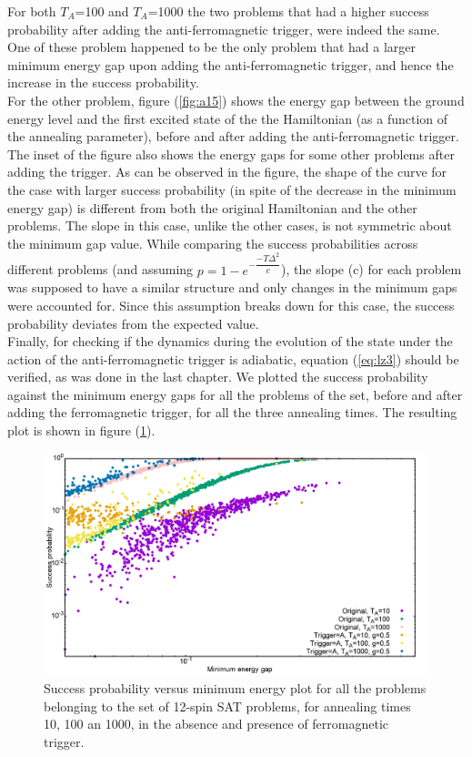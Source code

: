 \documentclass[12]{article}
\begin{document}
For both $T_A$=100 and $T_A$=1000 the two problems that had a higher success probability after adding the anti-ferromagnetic trigger, were indeed the same. One of these problem happened to be the only problem that had a larger minimum energy gap upon adding the anti-ferromagnetic trigger, and hence the increase in the success probability. \\
For the other problem, figure (\ref{fig:a15}) shows the energy gap between the ground energy level and the first excited state of the the Hamiltonian (as a function of the annealing parameter), before and after adding the anti-ferromagnetic trigger. The inset of the figure also shows the energy gaps for some other problems after adding the trigger. As can be observed in the figure, the shape of the curve for the case with larger success probability (in spite of the decrease in the minimum energy gap) is different from both the original Hamiltonian and the other problems. The slope in this case, unlike the other cases, is not symmetric about the minimum gap value. While comparing the success probabilities across different problems (and assuming $p=1-e^{-\dfrac{-T {\Delta}^2}{c}}$), the slope (c) for  each problem was supposed to have a similar structure and only changes in the minimum gaps were accounted for. Since this assumption breaks down for this case, the success probability deviates from the expected value.\\

Finally, for checking if the dynamics during the evolution of the state under the action of the anti-ferromagnetic trigger is adiabatic, equation (\ref{eq:lz3}) should be verified, as was done in the last chapter. We plotted the success probability against the minimum energy gaps for all the problems of the set, before and after adding the ferromagnetic trigger, for all the three annealing times. The resulting plot is shown in figure (\ref{fig:a17}).

\begin{figure}[H]
\centering 
\includegraphics[scale=0.3]{SuccVsGap_OA_g0.png}
\caption{Success probability versus minimum energy plot for all the problems belonging to the set of 12-spin SAT problems, for annealing times 10, 100 an 1000, in the absence and presence of ferromagnetic trigger.}
\label{fig:a17}
\end{figure}
\end{document}
